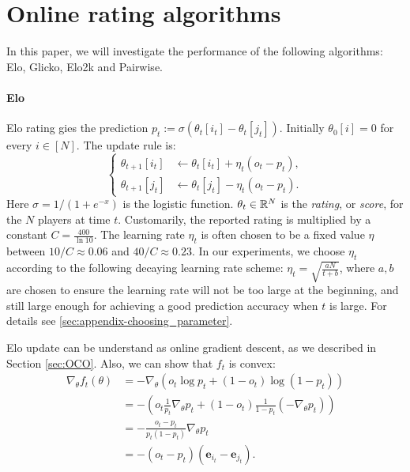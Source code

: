 \section{Online rating algorithms}


\label{sec:appendix-algorithm}


In this paper, we will investigate the performance of the following algorithms: Elo, Glicko, Elo2k and Pairwise. 
\paragraph{Elo}
Elo rating gies the prediction          $p_t := \sigma\left(\theta_t[i_t] - \theta_t[j_t]\right)$. Initially $\theta_0[i]=0$ for every $i \in [N]$. The update rule is:
\begin{equation}
    \begin{cases}
    \theta_{t+1}[i_t] &\gets \theta_{t}[i_t] + \eta_t \left(o_t - p_t\right),\\
    \theta_{t+1}[j_t] &\gets \theta_{t}[j_t] - \eta_t \left(o_t - p_t\right).
    \end{cases}
\end{equation}
Here $\sigma = 1/(1+e^{-x})$ is the logistic function. $\theta_t\in\mathbb{R}^N$ is the \emph{rating}, or \emph{score}, for the $N$ players at time $t$. Customarily, the reported rating is multiplied by a constant $C = \frac{400}{\ln 10}$. The learning rate $\eta_t$ is often chosen to be a fixed value $\eta$ between $10/C\approx 0.06$ and $40/C\approx 0.23$. In our experiments, we choose $\eta_t$ according to the following decaying learning rate scheme: $\eta_t = \sqrt{\frac{aN}{t+b}}$, where $a,b$ are chosen to ensure the learning rate will not be too large at the beginning, and still large enough for achieving a good prediction accuracy when $t$ is large. For details see \ref{sec:appendix-choosing_parameter}.




Elo update can be understand as online gradient descent, as we described in Section \ref{sec:OCO}. Also, we can show that $f_t$ is convex:
\begin{align*}
    \nabla_{\theta} f_t(\theta) &= -\nabla_{\theta} (o_t \log  p_t + (1-o_t) \log (1-p_t)) \\
    &=- (o_t   \frac{1}{p_t} \nabla_{\theta}  p_t + (1-o_t)  \frac{1}{1-p_t} ( -\nabla_{\theta}  p_t ) ) \\
    &= - \frac{o_t - p_t}{p_t(1-p_t)} \nabla_{\theta}  p_t \\
    &= - (o_t - p_t) (\boldsymbol{e}_{i_t}- \boldsymbol{e}_{j_t}).
\end{align*}

